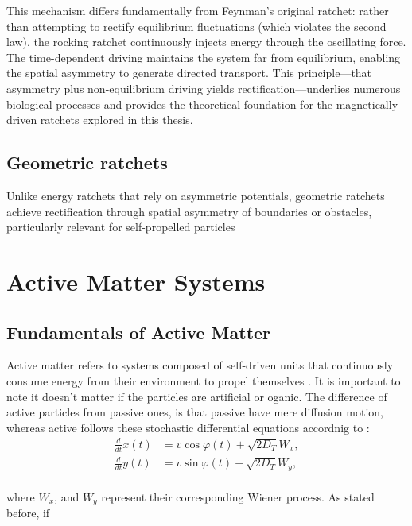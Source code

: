 This mechanism differs fundamentally from Feynman's original ratchet: rather than attempting to rectify equilibrium fluctuations (which violates the second law), the rocking ratchet continuously injects energy through the oscillating force. The time-dependent driving maintains the system far from equilibrium, enabling the spatial asymmetry to generate directed transport. This principle—that asymmetry plus non-equilibrium driving yields rectification—underlies numerous biological processes and provides the theoretical foundation for the magnetically-driven ratchets explored in this thesis.

\section{Geometric ratchets}

Unlike energy ratchets that rely on asymmetric potentials, geometric ratchets achieve rectification through spatial asymmetry of boundaries or obstacles, particularly relevant for self-propelled particles

\chapter{Active Matter Systems}
\label{ch:activeandpassivemattersystems}

\section{Fundamentals of Active Matter}

Active matter refers to systems composed of self-driven units that continuously consume energy from their environment to propel themselves \cite{marchetti2013hydrodynamics, ramaswamy2010mechanics}. It is important to note it doesn't matter if the particles are artificial or oganic. The difference of active particles from passive ones, is that passive have mere diffusion motion, whereas active follows these stochastic differential equations accordnig to \cite{volpe2014simulation}:
\begin{align}
  \frac{d}{dt}x(t) &= v\cos{\varphi(t)} + \sqrt{2D_T}W_x,\\
  \frac{d}{dt}y(t) &= v\sin{\varphi(t)} + \sqrt{2D_T}W_y,\\
  \label{eq:activestochasticequation}
\end{align}

where $W_x$, and $W_y$ represent their corresponding Wiener process. As stated before, if 

